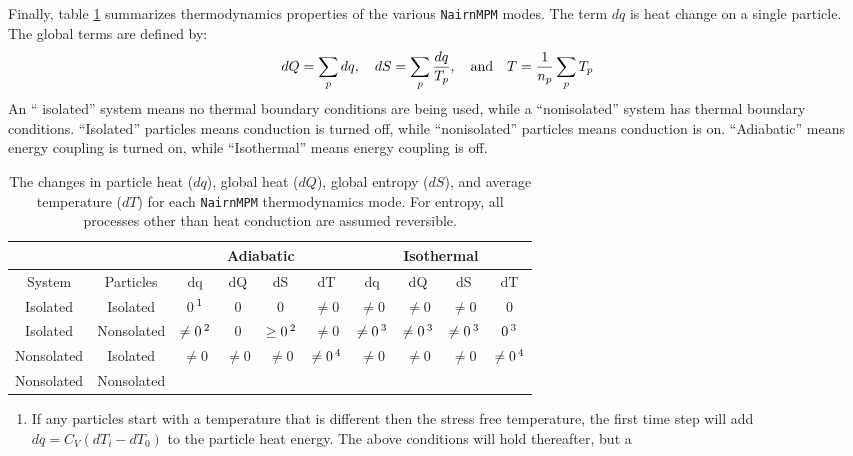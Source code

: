 \documentclass[11pt]{article}
\begin{document}
Finally, table \ref{tdmodes} summarizes thermodynamics properties of the various {\tt NairnMPM} modes. The term $dq$ is heat change on a single particle. The global terms are defined by:
\begin{equation}
     dQ = \sum_p dq, \quad dS = \sum_p {dq\over T_p}, \quad{\rm and}\quad T = {1\over n_p}\sum_p T_p
\end{equation}
An `` isolated'' system means no thermal boundary conditions are being used, while a ``nonisolated'' system has thermal boundary conditions. ``Isolated'' particles means conduction is turned off, while ``nonisolated'' particles means conduction is on. ``Adiabatic'' means energy coupling is turned on, while ``Isothermal'' means energy coupling is off.

\begin{table}\renewcommand{\arraystretch}{1.2}
\caption{The changes in particle heat ($dq$), global heat ($dQ$), global entropy ($dS$), and average temperature ($dT$) for each {\tt NairnMPM} thermodynamics mode. For entropy, all processes other than heat conduction are assumed reversible.}
\vskip6pt
\label{tdmodes}
\centering
\begin{tabular}{|c|c|c|c|c|c|c|c|c|c|}
\hline
 &  & \multicolumn{4}{|c|}{Adiabatic} & \multicolumn{4}{|c|}{Isothermal} \\
\hline
System & Particles & dq & dQ & dS & dT & dq & dQ & dS & dT \\
\hline
Isolated & Isolated & 0$\thinspace^1$ & 0 & 0 & $\ne0$ & $\ne0$ & $\ne0$ & $\ne0$ & 0 \\
\hline
Isolated & Nonsolated & $\ne0\thinspace^2$ & 0 & $\ge0\thinspace^2$ & $\ne0$ &
          $\ne0\thinspace^3$ & $\ne0\thinspace^3$ & $\ne0\thinspace^3$ & $0\thinspace^3$ \\
\hline
Nonsolated & Isolated & \multirow{2}{*}{$\ne0$} & \multirow{2}{*}{$\ne0$} & \multirow{2}{*}{$\ne0$}
      & \multirow{2}{*}{$\ne0\thinspace^4$} & \multirow{2}{*}{$\ne0$} & \multirow{2}{*}{$\ne0$} & 
      \multirow{2}{*}{$\ne0$} & \multirow{2}{*}{$\ne0\thinspace^4$} \\
\cline{1-2}
Nonsolated & Nonsolated & & & & & & & &  \\
\hline
\end{tabular}
{\footnotesize
\begin{enumerate}
\item If any particles start with a temperature that is different then the stress free temperature, the first
time step will add $dq=C_V(dT_i-dT_0)$ to the particle heat energy. The above conditions will hold thereafter, but a

\end{enumerate}}
\end{table}
\end{document}
